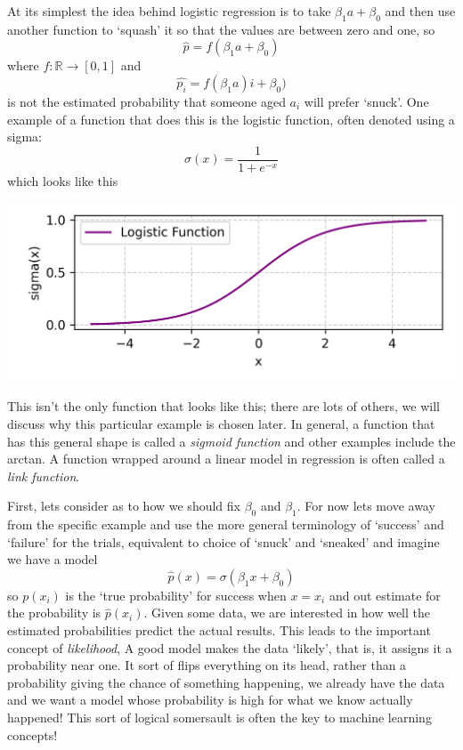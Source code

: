 \documentclass[12pt]{article}
\begin{document}
At its simplest the idea behind logistic regression is to take
$\beta_1a+\beta_0$ and then use another function to `squash' it so
that the values are between zero and one, so
\begin{equation}
\hat{p}=f(\beta_1 a+\beta_0)
\end{equation}
where $f:\mathbb{R}\rightarrow[0,1]$ and
\begin{equation}
\hat{p_i}=f(\beta_1 a)i+\beta_0)
\end{equation}
is not the estimated probability that someone aged $a_i$ will prefer
`snuck'. One example of a function that does this is the logistic
function, often denoted using a sigma:
\begin{equation}
  \sigma(x)=\frac{1}{1+e^{-x}}
\end{equation}
which looks like this
\begin{center}
  \includegraphics[]{02.4_logistic.png}
\end{center}
This isn't the only function that looks like this; there are lots of
others, we will discuss why this particular example is chosen
later. In general, a function that has this general shape is called a
\textsl{sigmoid function} and other examples include the arctan. A
function wrapped around a linear model in regression is often called a
\textsl{link function}.

First, lets consider as to how we should fix $\beta_0$ and
$\beta_1$. For now lets move away from the specific example and use
the more general terminology of `success' and `failure' for the
trials, equivalent to choice of `snuck' and `sneaked' and imagine we
have a model
\begin{equation}
\hat{p}(x)=\sigma(\beta_1 x+\beta_0)
\end{equation}
so $p(x_i)$ is the `true probability' for success when $x=x_i$ and out
estimate for the probability is $\hat{p}(x_i)$.  Given some data, we
are interested in how well the estimated probabilities predict the
actual results. This leads to the important concept of
\textsl{likelihood}, A good model makes the data `likely', that is, it
assigns it a probability near one. It sort of flips everything on its
head, rather than a probability giving the chance of something
happening, we already have the data and we want a model whose
probability is high for what we know actually happened! This sort of
logical somersault is often the key to machine learning concepts!
\end{document}
